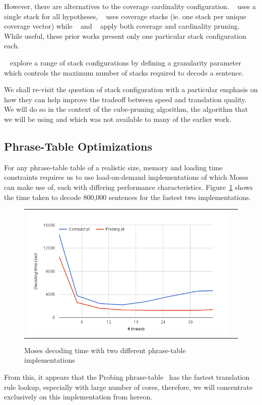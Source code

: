 \documentclass[11pt]{article}
\begin{document}
However, there are alternatives to the coverage cardinality configuration. ~ uses a single stack for all hypotheses, ~ uses coverage stacks (ie. one stack per unique coverage vector) while ~ and ~ apply both coverage and cardinality pruning. While useful, these prior works present only one particular stack configuration each.

~ explore a range of stack configurations by defining a granularity parameter which controls the maximum number of stacks required to decode a sentence. 

We shall re-visit the question of stack configuration with a particular emphasis on how they can help improve the tradeoff between speed and translation quality. We will do so in the context of the cube-pruning algorithm, the algorithm that we will be using and which was not available to many of the earlier work.

\subsection{Phrase-Table Optimizations}

For any phrase-table table of a realistic size, memory and loading time constraints requires us to use load-on-demand implementations of which Moses can make use of, each with differing performance characteristics. Figure~\ref{fig:moses-phrase-tables-time} shows the time taken to decode 800,000 sentences for the fastest two implementations.
\begin{figure}[h]
\centering
\begin{tabular}{cc}
{\includegraphics[scale=0.4]{moses-phrase-table.png}} 
\end{tabular}
\caption{Moses decoding time with two different phrase-table implementations}
\label{fig:moses-phrase-tables-time}
\end{figure} 
From this, it appears that the Probing phrase-table~\cite{Bogoychev:Thesis:2013} has the fastest translation rule lookup, especially with large number of cores, therefore, we will concentrate exclusively on this implementation from hereon.
\end{document}
